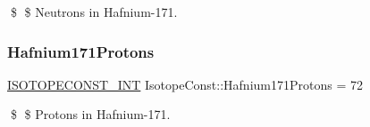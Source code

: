 \$ \$ Neutrons in Hafnium-\/171. \mbox{\label{group___isotope_const-_hafnium-_hf171_gad5edca836bfadc575a838ddf786cc9c5}} 
\subsubsection{\texorpdfstring{Hafnium171\+Protons}{Hafnium171Protons}}
{\footnotesize\ttfamily \mbox{\hyperlink{group___isotope_const-_macros_ga5f18360b3e99483a35c32d789e62621c}{I\+S\+O\+T\+O\+P\+E\+C\+O\+N\+S\+T\+\_\+\+I\+NT}} Isotope\+Const\+::\+Hafnium171\+Protons = 72}

\$ \$ Protons in Hafnium-\/171. 